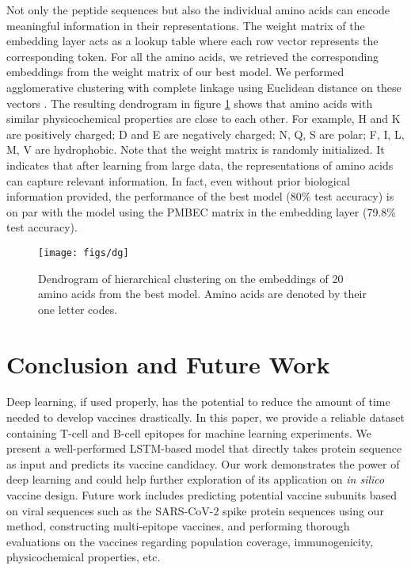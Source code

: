 \documentclass[conference]{IEEEtran}
\begin{document}
Not only the peptide sequences but also the individual amino acids can encode meaningful information in their representations. The weight matrix of the embedding layer acts as a lookup table where each row vector represents the corresponding token. For all the amino acids, we retrieved the corresponding embeddings from the weight matrix of our best model. We performed agglomerative clustering with complete linkage using Euclidean distance on these vectors \cite{mullner2011modern}. The resulting dendrogram in figure \ref{fig4} shows that amino acids with similar physicochemical properties are close to each other. For example, H and K are positively charged; D and E are negatively charged; N, Q, S are polar; F, I, L, M, V are hydrophobic. Note that the weight matrix is randomly initialized. It indicates that after learning from large data, the representations of amino acids can capture relevant information. In fact, even without prior biological information provided, the performance of the best model (80\% test accuracy) is on par with the model using the PMBEC matrix in the embedding layer (79.8\% test accuracy).

\begin{figure}
\begin{center}
\texttt{[image: figs/dg]}
\end{center}
\caption{Dendrogram of hierarchical clustering on the embeddings of 20 amino acids from the best model. Amino acids are denoted by their one letter codes.}
\label{fig4}
\end{figure}

\section{Conclusion and Future Work}
Deep learning, if used properly, has the potential to reduce the amount of time needed to develop vaccines drastically. In this paper, we provide a reliable dataset containing T-cell and B-cell epitopes for machine learning experiments. We present a well-performed LSTM-based model that directly takes protein sequence as input and predicts its vaccine candidacy. Our work demonstrates the power of deep learning and could help further exploration of its application on \emph{in silico} vaccine design. Future work includes predicting potential vaccine subunits based on viral sequences such as the SARS-CoV-2 spike protein sequences using our method, constructing multi-epitope vaccines, and performing thorough evaluations on the vaccines regarding population coverage, immunogenicity, physicochemical properties, etc.



\end{document}
